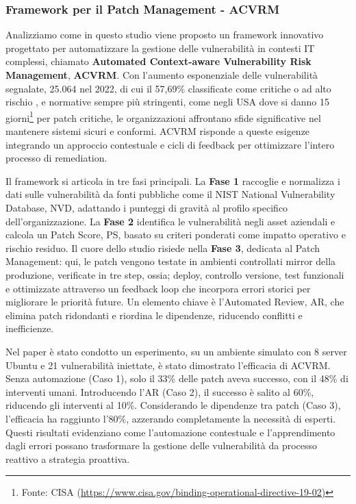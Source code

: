             \subsubsection{Framework per il Patch Management - ACVRM}
                Analizziamo come in questo studio \cite{patch_man_framework} viene proposto un framework innovativo progettato per automatizzare la gestione delle vulnerabilità in contesti IT complessi, chiamato \textbf{Automated Context-aware Vulnerability Risk Management}, \textbf{ACVRM}. Con l'aumento esponenziale delle vulnerabilità segnalate, 25.064 nel 2022, di cui il 57,69\% classificate come critiche o ad alto rischio \cite{nist_nvd_database}, e normative sempre più stringenti, come negli USA dove si danno 15 giorni\footnote{Fonte: CISA (\url{https://www.cisa.gov/binding-operational-directive-19-02)}} per patch critiche, le organizzazioni affrontano sfide significative nel mantenere sistemi sicuri e conformi. ACVRM risponde a queste esigenze integrando un approccio contestuale e cicli di feedback per ottimizzare l'intero processo di remediation.

                Il framework si articola in tre fasi principali. La \textbf{Fase 1} raccoglie e normalizza i dati sulle vulnerabilità da fonti pubbliche come il NIST National Vulnerability Database, NVD, adattando i punteggi di gravità al profilo specifico dell'organizzazione. La \textbf{Fase 2} identifica le vulnerabilità negli asset aziendali e calcola un Patch Score, PS, basato su criteri ponderati come impatto operativo e rischio residuo. 
                \newpage
                Il cuore dello studio risiede nella \textbf{Fase 3}, dedicata al Patch Management: qui, le patch vengono testate in ambienti controllati mirror della produzione, verificate in tre step, ossia; deploy, controllo versione, test funzionali e ottimizzate attraverso un feedback loop che incorpora errori storici per migliorare le priorità future. Un elemento chiave è l'Automated Review, AR, che elimina patch ridondanti e riordina le dipendenze, riducendo conflitti e inefficienze.
                
                Nel paper è stato condotto un  esperimento, su un ambiente simulato con 8 server Ubuntu e 21 vulnerabilità iniettate, è stato dimostrato l’efficacia di ACVRM. Senza automazione (Caso 1), solo il 33\% delle patch aveva successo, con il 48\% di interventi umani. Introducendo l'AR (Caso 2), il successo è salito al 60\%, riducendo gli interventi al 10\%. Considerando le dipendenze tra patch (Caso 3), l’efficacia ha raggiunto l’80\%, azzerando completamente la necessità di esperti. Questi risultati evidenziano come l'automazione contestuale e l'apprendimento dagli errori possano trasformare la gestione delle vulnerabilità da processo reattivo a strategia proattiva.
                
